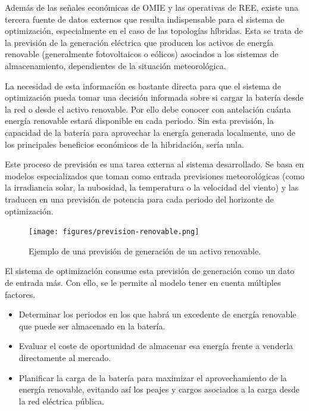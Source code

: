 Además de las señales económicas de OMIE y las operativas de REE, existe una tercera fuente de datos externos que resulta indispensable para el sistema de optimización, especialmente en el caso de las topologías híbridas. Esta se trata de la previsión de la generación eléctrica que producen los activos de energía renovable (generalmente fotovoltaicos o eólicos) asociados a los sistemas de almacenamiento, dependientes de la situación meteorológica.

La necesidad de esta información es bastante directa para que el sistema de optimización pueda tomar una decisión informada sobre si cargar la batería desde la red o desde el activo renovable. Por ello debe conocer con antelación cuánta energía renovable estará disponible en cada periodo. Sin esta previsión, la capacidad de la batería para aprovechar la energía generada localmente, uno de los principales beneficios económicos de la hibridación, sería nula.

Este proceso de previsión es una tarea externa al sistema desarrollado. Se basa en modelos especializados que toman como entrada previsiones meteorológicas (como la irradiancia solar, la nubosidad, la temperatura o la velocidad del viento) y las traducen en una previsión de potencia para cada periodo del horizonte de optimización.

\begin{figure}
  \centering
  \texttt{[image: figures/prevision-renovable.png]}
  \caption{Ejemplo de una previsión de generación de un activo renovable.}
  \label{fig:prevision-renovable}
\end{figure}

El sistema de optimización consume esta previsión de generación como un dato de entrada más. Con ello, se le permite al modelo tener en cuenta múltiples factores.

\begin{itemize}

  \item Determinar los periodos en los que habrá un excedente de energía renovable que puede ser almacenado en la batería.

  \item Evaluar el coste de oportunidad de almacenar esa energía frente a venderla directamente al mercado.

  \item Planificar la carga de la batería para maximizar el aprovechamiento de la energía renovable, evitando así los peajes y cargos asociados a la carga desde la red eléctrica pública.

\end{itemize}


